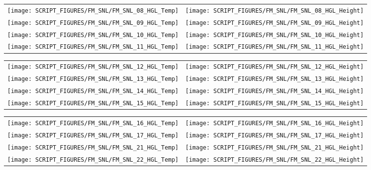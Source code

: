 \begin{figure}[!ht]
\begin{tabular*}{\textwidth}{l@{\extracolsep{\fill}}r}
\texttt{[image: SCRIPT\_FIGURES/FM\_SNL/FM\_SNL\_08\_HGL\_Temp]} &
\texttt{[image: SCRIPT\_FIGURES/FM\_SNL/FM\_SNL\_08\_HGL\_Height]} \\
\texttt{[image: SCRIPT\_FIGURES/FM\_SNL/FM\_SNL\_09\_HGL\_Temp]} &
\texttt{[image: SCRIPT\_FIGURES/FM\_SNL/FM\_SNL\_09\_HGL\_Height]} \\
\texttt{[image: SCRIPT\_FIGURES/FM\_SNL/FM\_SNL\_10\_HGL\_Temp]} &
\texttt{[image: SCRIPT\_FIGURES/FM\_SNL/FM\_SNL\_10\_HGL\_Height]} \\
\texttt{[image: SCRIPT\_FIGURES/FM\_SNL/FM\_SNL\_11\_HGL\_Temp]} &
\texttt{[image: SCRIPT\_FIGURES/FM\_SNL/FM\_SNL\_11\_HGL\_Height]}
\end{tabular*}
\end{figure}

\begin{figure}[!ht]
\begin{tabular*}{\textwidth}{l@{\extracolsep{\fill}}r}
\texttt{[image: SCRIPT\_FIGURES/FM\_SNL/FM\_SNL\_12\_HGL\_Temp]} &
\texttt{[image: SCRIPT\_FIGURES/FM\_SNL/FM\_SNL\_12\_HGL\_Height]} \\
\texttt{[image: SCRIPT\_FIGURES/FM\_SNL/FM\_SNL\_13\_HGL\_Temp]} &
\texttt{[image: SCRIPT\_FIGURES/FM\_SNL/FM\_SNL\_13\_HGL\_Height]} \\
\texttt{[image: SCRIPT\_FIGURES/FM\_SNL/FM\_SNL\_14\_HGL\_Temp]} &
\texttt{[image: SCRIPT\_FIGURES/FM\_SNL/FM\_SNL\_14\_HGL\_Height]} \\
\texttt{[image: SCRIPT\_FIGURES/FM\_SNL/FM\_SNL\_15\_HGL\_Temp]} &
\texttt{[image: SCRIPT\_FIGURES/FM\_SNL/FM\_SNL\_15\_HGL\_Height]}
\end{tabular*}
\end{figure}


\begin{figure}[!ht]
\begin{tabular*}{\textwidth}{l@{\extracolsep{\fill}}r}
\texttt{[image: SCRIPT\_FIGURES/FM\_SNL/FM\_SNL\_16\_HGL\_Temp]} &
\texttt{[image: SCRIPT\_FIGURES/FM\_SNL/FM\_SNL\_16\_HGL\_Height]} \\
\texttt{[image: SCRIPT\_FIGURES/FM\_SNL/FM\_SNL\_17\_HGL\_Temp]} &
\texttt{[image: SCRIPT\_FIGURES/FM\_SNL/FM\_SNL\_17\_HGL\_Height]} \\
\texttt{[image: SCRIPT\_FIGURES/FM\_SNL/FM\_SNL\_21\_HGL\_Temp]} &
\texttt{[image: SCRIPT\_FIGURES/FM\_SNL/FM\_SNL\_21\_HGL\_Height]} \\
\texttt{[image: SCRIPT\_FIGURES/FM\_SNL/FM\_SNL\_22\_HGL\_Temp]} &
\texttt{[image: SCRIPT\_FIGURES/FM\_SNL/FM\_SNL\_22\_HGL\_Height]}
\end{tabular*}
\end{figure}

